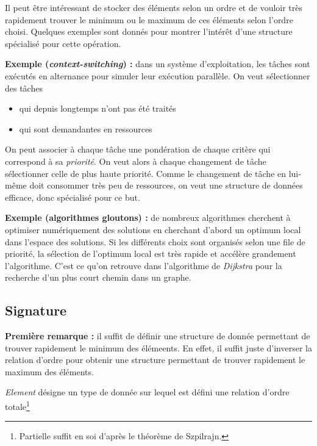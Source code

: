 \documentclass[../../../main.tex]{subfiles}
\begin{document}
Il peut être intéressant de stocker des éléments selon un ordre et de vouloir très rapidement trouver le minimum ou le maximum de ces éléments selon l'ordre choisi. Quelques exemples sont donnés pour montrer l'intérêt d'une structure spécialisé pour cette opération. 

\textbf{Exemple (\textit{context-switching}) :} dans un système d'exploitation, les tâches sont exécutés en alternance pour simuler leur exécution parallèle. On veut sélectionner des tâches 
\begin{itemize}
	\item qui depuis longtemps n'ont pas été traités
	\item qui sont demandantes en ressources
\end{itemize}
On peut associer à chaque tâche une pondération de chaque critère qui correspond à sa \textit{priorité}. On veut alors à chaque changement de tâche sélectionner celle de plus haute priorité. Comme le changement de tâche en lui-même doit consommer très peu de ressources, on veut une structure de données efficace, donc spécialisé pour ce but.

\textbf{Exemple (algorithmes gloutons) :} de nombreux algorithmes cherchent à optimiser numériquement des solutions en cherchant d'abord un optimum local dans l'espace des solutions. Si les différents choix sont organisés selon une file de priorité, la sélection de l'optimum local est très rapide et accélère grandement l'algorithme. C'est ce qu'on retrouve dans l'algorithme de \textit{Dijkstra} pour la recherche d'un plus court chemin dans un graphe.
\subsection{Signature}
\textbf{Première remarque :} il suffit de définir une structure de donnée permettant de trouver rapidement le minimum des élémeents. En effet, il suffit juste d'inverser la relation d'ordre pour obtenir une structure permettant de trouver rapidement le maximum des éléments.

\textit{Element} désigne un type de donnée sur lequel est défini une relation d'ordre totale\footnote{Partielle suffit en soi d'après le théorème de Szpilrajn.}
\end{document}
